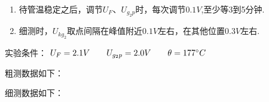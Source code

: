 \documentclass[12pt,a4paper,UTF8]{ctexart}
\begin{document}
	\begin{enumerate}[(1)]
	\item 待管温稳定之后，调节$U_F$、$U_{g_2p}$时，每次调节$0.1V$,至少等3到5分钟.
	\item 细测时，$U_{kg_2}$取点间隔在峰值附近$0.1V$左右，在其他位置$0.3V$左右.
	\end{enumerate}
	\par
	实验条件：
	$U_F=2.1V\qquad	U_{g_{2}p}=2.0V\qquad \theta=177\degree C$ 
	\par
	粗测数据如下：
	\begin{table}[htbp]	
	\centering
	\end{table}
	\newpage
	细测数据如下：
\end{document}
